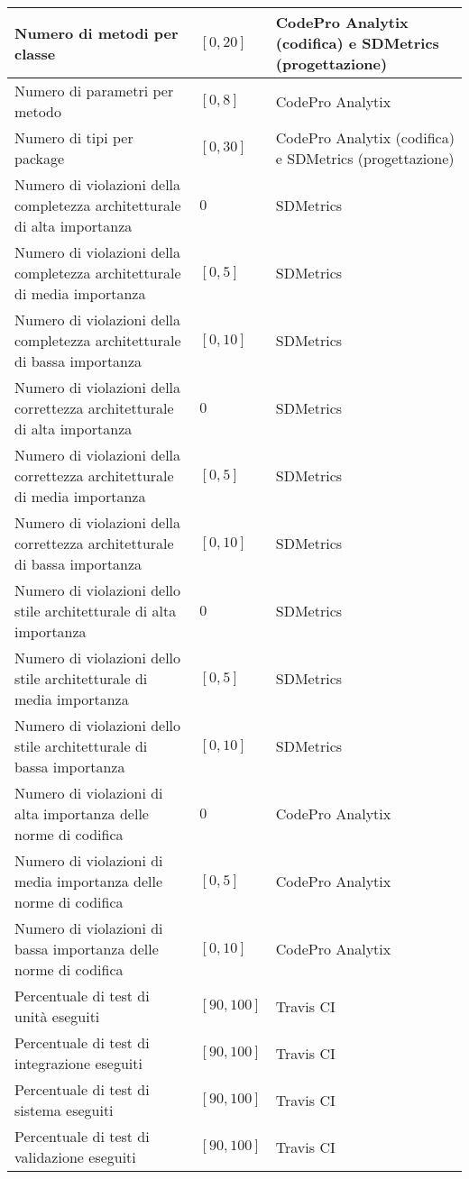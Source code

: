 \begin{longtable}{|p{}|p{}|p{}|}
	\hline 
	Numero di metodi per classe &  $[0, 20]$ &  CodePro Analytix (codifica) e SDMetrics (progettazione) \\
	\hline 
	Numero di parametri per metodo &  $[0, 8]$ &  CodePro Analytix \\
	\hline 
	Numero di tipi per package &  $[0, 30]$ &  CodePro Analytix (codifica) e SDMetrics (progettazione) \\
	\hline 
	Numero di violazioni della completezza architetturale di alta importanza &  $0$ &  SDMetrics \\
	\hline 
	Numero di violazioni della completezza architetturale di media importanza &  $[0, 5]$ &  SDMetrics \\
	\hline 
	Numero di violazioni della completezza architetturale di bassa importanza &  $[0, 10]$ &  SDMetrics \\
	\hline 
	Numero di violazioni della correttezza architetturale di alta importanza &  $0$ &  SDMetrics \\
	\hline 
	Numero di violazioni della correttezza architetturale di media importanza &  $[0, 5]$ &  SDMetrics \\
	\hline 
	Numero di violazioni della correttezza architetturale di bassa importanza &  $[0, 10]$ &  SDMetrics \\
	\hline 
	Numero di violazioni dello stile architetturale di alta importanza &  $0$ &  SDMetrics \\
	\hline 
	Numero di violazioni dello stile architetturale di media importanza &  $[0, 5]$ &  SDMetrics \\
	\hline 
	Numero di violazioni dello stile architetturale di bassa importanza &  $[0, 10]$ &  SDMetrics \\
	\hline 
	Numero di violazioni di alta importanza delle norme di codifica &  $0$ &  CodePro Analytix \\
	\hline 
	Numero di violazioni di media importanza delle norme di codifica &  $[0, 5]$ &  CodePro Analytix \\
	\hline 
	Numero di violazioni di bassa importanza delle norme di codifica &  $[0, 10]$ &  CodePro Analytix \\
	\hline 
	Percentuale di test di unità eseguiti &  $[90, 100]$ &  Travis CI \\
	\hline 
	Percentuale di test di integrazione eseguiti &  $[90, 100]$ &  Travis CI \\
	\hline 
	Percentuale di test di sistema eseguiti &  $[90, 100]$ &  Travis CI \\
	\hline 
	Percentuale di test di validazione eseguiti &  $[90, 100]$ & Travis CI \\

\end{longtable}
